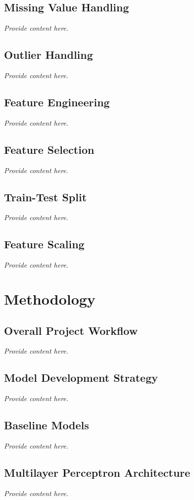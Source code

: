 \documentclass[12pt, a4paper]{article}
\begin{document}
\subsection{Missing Value Handling}
\textit{Provide content here.}

\subsection{Outlier Handling}
\textit{Provide content here.}

\subsection{Feature Engineering}
\textit{Provide content here.}

\subsection{Feature Selection}
\textit{Provide content here.}

\subsection{Train-Test Split}
\textit{Provide content here.}

\subsection{Feature Scaling}
\textit{Provide content here.}

\section{Methodology}
\subsection{Overall Project Workflow}
\textit{Provide content here.}

\subsection{Model Development Strategy}
\textit{Provide content here.}

\subsection{Baseline Models}
\textit{Provide content here.}

\subsection{Multilayer Perceptron Architecture}
\textit{Provide content here.}
\end{document}
